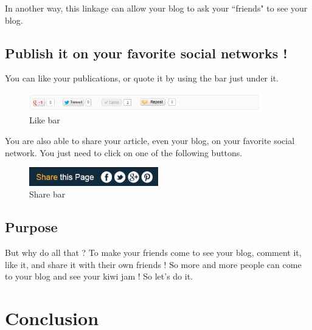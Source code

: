 \documentclass[a4paper,10pt]{article}
\begin{document}
In another way, this linkage can allow your blog to ask your ``friends" to see your blog.

\subsection{Publish it on your favorite social networks !}

You can like your publications, or quote it by using the bar just under it.

\begin{figure}[h]
    \center
  \includegraphics[width=0.9\textwidth]{Images/articleBar.png}
    \caption{Like bar}
\end{figure}

You are also able to share your article, even your blog, on your favorite social network. You just need to click on one of the following buttons.

\begin{figure}[h]
    \center
  \includegraphics[width=0.5\textwidth]{Images/blogBar.png}
    \caption{Share bar}
\end{figure}

\subsection{Purpose}

But why do all that ? To make your friends come to see your blog, comment it, like it, and share it with their own friends ! So more and more people can come to your blog and see your kiwi jam ! So let's do it.

 


\newpage
\section{Conclusion}
\end{document}
